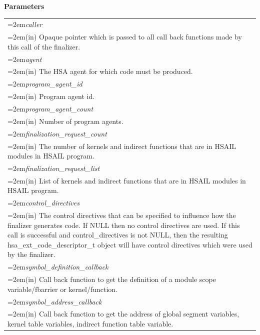\documentclass[final]{book}
\newcommand{\hsaarg}[1]{\textit{#1}}
\begin{document}
\noindent\textbf{Parameters}\\[-6mm]
\noindent\begin{longtable}{@{}>{\hangindent=2em}p{\textwidth}}
\hsaarg{caller}\\\hspace{2em}(in) Opaque pointer which is passed to all call back functions made by this call of the finalizer.\\[2mm]
\hsaarg{agent}\\\hspace{2em}(in) The HSA agent for which code must be produced.\\[2mm]
\hsaarg{program_agent_id}\\\hspace{2em}(in) Program agent id.\\[2mm]
\hsaarg{program_agent_count}\\\hspace{2em}(in) Number of program agents.\\[2mm]
\hsaarg{finalization_request_count}\\\hspace{2em}(in) The number of kernels and indirect functions that are in HSAIL modules in HSAIL program.\\[2mm]
\hsaarg{finalization_request_list}\\\hspace{2em}(in) List of kernels and indirect functions that are in HSAIL modules in HSAIL program.\\[2mm]
\hsaarg{control_directives}\\\hspace{2em}(in) The control directives that can be specified to influence how the finalizer generates code. If NULL then no control directives are used. If this call is successful and control_directives is not NULL, then the resulting hsa_ext_code_descriptor_t object will have control directives which were used by the finalizer.\\[2mm]
\hsaarg{symbol_definition_callback}\\\hspace{2em}(in) Call back function to get the definition of a module scope variable/fbarrier or kernel/function.\\[2mm]
\hsaarg{symbol_address_callback}\\\hspace{2em}(in) Call back function to get the address of global segment variables, kernel table variables, indirect function table variable.\\[2mm]

\end{longtable}
\end{document}
